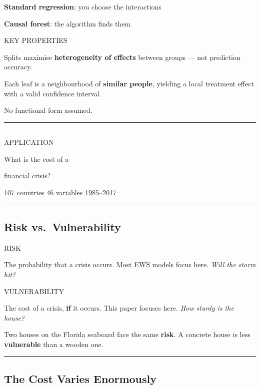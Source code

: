 \documentclass[
  letterpaper,
  DIV=11,
  numbers=noendperiod]{scrartcl}
\begin{document}
{\textbf{Standard regression}: you choose the interactions}

{\textbf{Causal forest}: the algorithm finds them}

{KEY PROPERTIES}

Splits maximise \textbf{heterogeneity of effects} between groups --- not
prediction accuracy.

Each leaf is a neighbourhood of \textbf{similar people}, yielding a
local treatment effect with a valid confidence interval.

No functional form assumed.

\begin{center}\rule{0.5\linewidth}{0.5pt}\end{center}

\subsection{}\label{section-2}

{APPLICATION}

{What is the cost of a}

{financial crisis?}

{107 countries \textbar{} 46 variables \textbar{} 1985--2017}

\begin{center}\rule{0.5\linewidth}{0.5pt}\end{center}

\subsection{Risk vs.~Vulnerability}\label{risk-vs.-vulnerability}

{RISK}

The probability that a crisis occurs. Most EWS models focus here.
\emph{Will the storm hit?}

{VULNERABILITY}

The cost of a crisis, \textbf{if} it occurs. This paper focuses here.
\emph{How sturdy is the house?}

{Two houses on the Florida seaboard face the same \textbf{risk}. A
concrete house is less \textbf{vulnerable} than a wooden one.}

\begin{center}\rule{0.5\linewidth}{0.5pt}\end{center}

\subsection{The Cost Varies
Enormously}\label{the-cost-varies-enormously}
\end{document}
